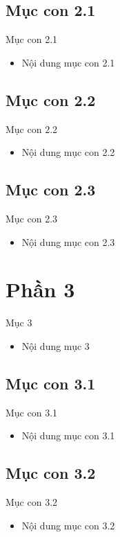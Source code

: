 \documentclass{beamer}
\begin{document}
\subsection{Mục con 2.1}
\begin{frame}{Mục con 2.1}
\begin{itemize}
\item Nội dung mục con 2.1
\end{itemize}
\end{frame}

\subsection{Mục con 2.2}
\begin{frame}{Mục con 2.2}
\begin{itemize}
\item Nội dung mục con 2.2
\end{itemize}
\end{frame}

\subsection{Mục con 2.3}
\begin{frame}{Mục con 2.3}
\begin{itemize}
\item Nội dung mục con 2.3
\end{itemize}
\end{frame}

\section{Phần 3}
\begin{frame}{Mục 3}
\begin{itemize}
\item Nội dung mục 3
\end{itemize}
\end{frame}

\subsection{Mục con 3.1}
\begin{frame}{Mục con 3.1}
\begin{itemize}
\item Nội dung mục con 3.1
\end{itemize}
\end{frame}

\subsection{Mục con 3.2}
\begin{frame}{Mục con 3.2}
\begin{itemize}
\item Nội dung mục con 3.2
\end{itemize}
\end{frame}
\end{document}
